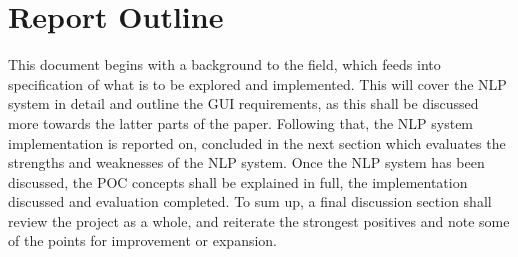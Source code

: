 \section{Report Outline}

This document begins with a background to the field, which feeds into specification of what is to be explored and implemented. This will cover the NLP system in detail and outline the GUI requirements, as this shall be discussed more towards the latter parts of the paper. Following that, the NLP system implementation is reported on, concluded in the next section which evaluates the strengths and weaknesses of the NLP system. Once the NLP system has been discussed, the POC concepts shall be explained in full, the implementation discussed and evaluation completed. To sum up, a final discussion section shall review the project as a whole, and reiterate the strongest positives and note some of the points for improvement or expansion.


